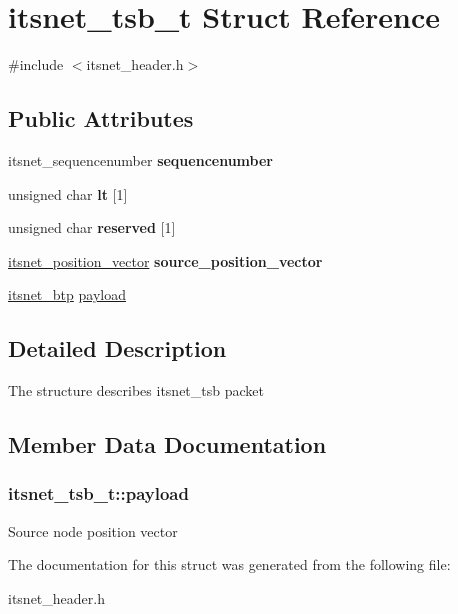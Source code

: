 \hypertarget{structitsnet__tsb__t}{\section{itsnet\-\_\-tsb\-\_\-t \-Struct \-Reference}
\label{structitsnet__tsb__t}
}


{\ttfamily \#include $<$itsnet\-\_\-header.\-h$>$}

\subsection*{\-Public \-Attributes}
\begin{DoxyCompactItemize}
\item 
\hypertarget{structitsnet__tsb__t_af76bb93ae30b50a5c1bd945e8673b7b5}{itsnet\-\_\-sequencenumber {\bfseries sequencenumber}}\label{structitsnet__tsb__t_af76bb93ae30b50a5c1bd945e8673b7b5}

\item 
\hypertarget{structitsnet__tsb__t_ad603f780086a9c270b5e0bcc5368cc31}{unsigned char {\bfseries lt} \mbox{[}1\mbox{]}}\label{structitsnet__tsb__t_ad603f780086a9c270b5e0bcc5368cc31}

\item 
\hypertarget{structitsnet__tsb__t_ac551626b66a7d8fc24defc9264b6f070}{unsigned char {\bfseries reserved} \mbox{[}1\mbox{]}}\label{structitsnet__tsb__t_ac551626b66a7d8fc24defc9264b6f070}

\item 
\hypertarget{structitsnet__tsb__t_aa9d5e35534f4862c57f4afc3315f7341}{\hyperlink{structitsnet__position__vector}{itsnet\-\_\-position\-\_\-vector} {\bfseries source\-\_\-position\-\_\-vector}}\label{structitsnet__tsb__t_aa9d5e35534f4862c57f4afc3315f7341}

\item 
\hyperlink{structitsnet__btp}{itsnet\-\_\-btp} \hyperlink{structitsnet__tsb__t_a3808277af600312bf45b282e0b4cef4e}{payload}
\end{DoxyCompactItemize}


\subsection{\-Detailed \-Description}
\-The structure describes itsnet\-\_\-tsb packet 

\subsection{\-Member \-Data \-Documentation}
\hypertarget{structitsnet__tsb__t_a3808277af600312bf45b282e0b4cef4e}{
\subsubsection[{payload}]{ {\bf itsnet\-\_\-tsb\-\_\-t\-::payload}}}\label{structitsnet__tsb__t_a3808277af600312bf45b282e0b4cef4e}
\-Source node position vector 

\-The documentation for this struct was generated from the following file\-:\begin{DoxyCompactItemize}
\item 
itsnet\-\_\-header.\-h\end{DoxyCompactItemize}
